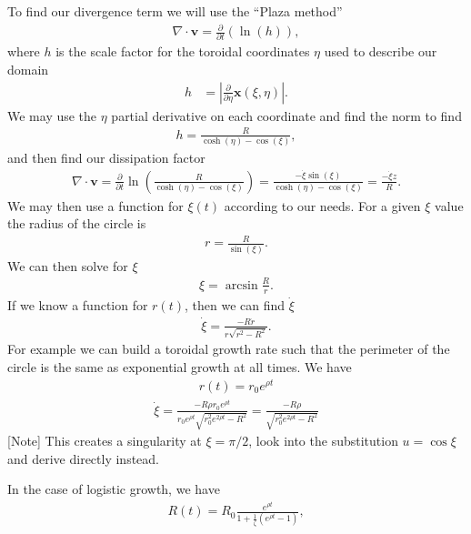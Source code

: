 \documentclass[fleqn,12pt]{siamart1116}
\begin{document}
To find our divergence term we will use the ``Plaza method''
\begin{align}
\nabla \cdot \mathbf{v} = \frac{\partial}{\partial t}(\ln(h)),
\end{align}
where $h$ is the scale factor for the toroidal coordinates $\eta$ used to describe our domain
\begin{align}
h &= \left|\frac{\partial}{\partial \eta}\mathbf{x}(\xi, \eta) \right|.
\end{align}
We may use the $\eta$ partial derivative on each coordinate and find the norm to find
\begin{align}
h = \frac{R}{\cosh(\eta) - \cos(\xi)},
\end{align}
and then find our dissipation factor
\begin{align}
\nabla \cdot \mathbf{v} = \frac{\partial}{\partial t} \ln \left( \frac{R}{\cosh(\eta) - \cos(\xi)} \right) = \frac{-\dot{\xi}\sin(\xi)}{\cosh(\eta) - \cos(\xi)} = \frac{-\dot{\xi}z}{R}.
\end{align}
We may then use a function for $\xi(t)$ according to our needs. For a given $\xi$ value the radius of the circle is
\begin{align}
r = \frac{R}{\sin(\xi)}.
\end{align}
We can then solve for $\xi$
\begin{align}
\xi = \arcsin\frac{R}{r}.
\end{align}
If we know a function for $r(t)$, then we can find $\dot{\xi}$
\begin{align}
\dot{\xi} = \frac{-R \dot{r}}{r \sqrt{r^2 - R^2}}.\label{torxir}
\end{align}
For example we can build a toroidal growth rate such that the perimeter of the circle is the same as exponential growth at all times. We have
\begin{align}
r(t) = r_0e^{\rho t} \label{torexprt}
\end{align}
\begin{align}
\dot{\xi} = \frac{-R \rho r_0 e^{\rho t}}{r_0 e^{\rho t} \sqrt{r_0^2 e^{2 \rho t} - R^2}} = \frac{-R \rho}{\sqrt{r_0^2 e^{2 \rho t} - R^2}}
\end{align}
[Note] This creates a singularity at $\xi = \pi/2$, look into the substitution $u = \cos \xi$ and derive directly instead.

In the case of logistic growth, we have
\begin{align}
R(t) = R_0\frac{e^{\rho t}}{1 + \frac{1}{\zeta}(e^{\rho t} - 1)},
\end{align}
\end{document}
